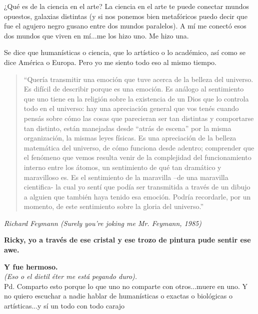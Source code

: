 \documentclass[16pt, a4 paper]{article}
\begin{document}
¿Qu\'e es de la ciencia en el arte? La ciencia en el arte te puede conectar mundos opuestos, galaxias distintas (y si nos ponemos bien metaf\'oricos puedo decir que fue el agujero negro gusano entre dos mundos paralelos). A m\'i me conect\'o esos dos mundos que viven en m\'i...me los hizo uno. Me hizo una.

Se dice que human\'isticas o ciencia, que lo art\'istico o lo acad\'emico, as\'i como se dice Am\'erica o Europa. Pero yo me siento todo eso al mismo tiempo. 

\begin{quote}“Quer\'ia transmitir una emoci\'on que tuve acerca de la belleza del universo. Es dif\'icil de describir porque es una emoci\'on. Es an\'alogo al sentimiento que uno tiene en la religi\'on sobre la existencia de un Dios que lo controla todo en el universo: hay una apreciaci\'on general que vos ten\'es cuando pens\'as sobre c\'omo las cosas que parecieran ser tan distintas y comportarse tan distinto, est\'an manejadas desde “atr\'as de escena” por la misma organizaci\'on, la mismas leyes f\'isicas. Es una apreciaci\'on de la belleza matem\'atica del universo, de c\'omo funciona desde adentro; comprender que el fen\'omeno que vemos resulta venir de la complejidad del funcionamiento interno entre los \'atomos, un sentimiento de qu\'e tan dram\'atico y maravilloso es. Es el sentimiento de la maravilla –de una maravilla cientifica- la cual yo sent\'i que pod\'ia ser transmitida a trav\'es de un dibujo a alguien que tambi\'en haya tenido esa emoci\'on. Podr\'ia recordarle, por un momento, de este sentimiento sobre la gloria del universo.” 
\end{quote}

\begin{flushright}
\textit {Richard Feymann (Surely you’re joking me Mr. Feymann, 1985)}
\end{flushright}

\textbf{Ricky, yo a trav\'es de ese cristal y ese trozo de pintura pude sentir ese awe.}

\textbf{Y fue hermoso.}\\

\textit{(Eso o el dietil \'eter me est\'a pegando duro).} \\

Pd. Comparto esto porque lo que uno no comparte con otros...muere en uno. Y no quiero escuchar a nadie hablar de human\'isticas o exactas o biol\'ogicas o art\'isticas...y s\'i un todo con todo \small carajo
\end{document}
